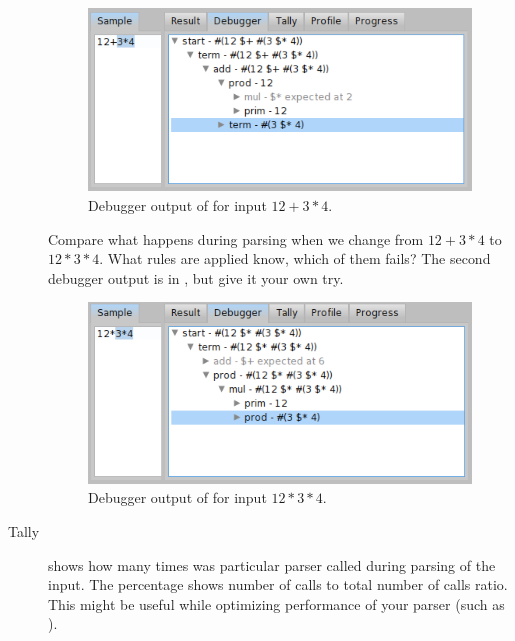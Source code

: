 \documentclass[a4paper,10pt,twoside]{book}
\begin{document}
\begin{description}
\begin{figure}[ht]
  \begin{center}
    \includegraphics[width=.8\linewidth]{PPBrowserDebugger3}
    \caption{Debugger output of  for input $12+3*4$. \label{fig:pp/debugger}}
  \end{center}
\end{figure}

  Compare what happens during parsing when we change from $12 + 3 * 4$ to $12 * 3 * 4$.
  What rules are applied know, which of them fails?
  The second debugger output is in , but give it your own try.

\begin{figure}[ht]
  \begin{center}
    \includegraphics[width=.8\linewidth]{PPBrowserDebugger4}
    \caption{Debugger output of  for input $12*3*4$. \label{fig:pp/debugger2}}
  \end{center}
\end{figure}

\item[Tally] shows how many times was particular parser called during
  parsing of the input. The percentage shows number of calls to total
  number of calls ratio. This might be useful while optimizing
  performance of your parser (such as  ).
    

\end{description}
\end{document}
